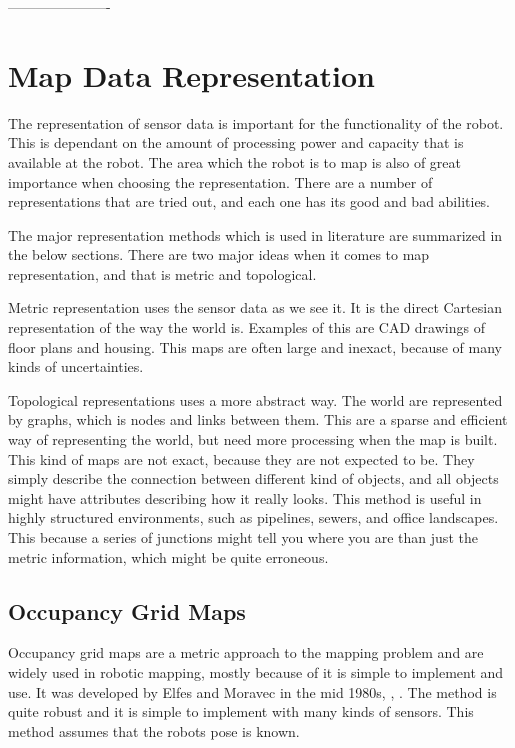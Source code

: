 ----------------------




\section{Map Data Representation}
The representation of sensor data is important for the functionality of the robot. This is
dependant on the amount of processing power and capacity that is available at the robot.
The area which the robot is to map is also of great importance when choosing the
representation. There are a number of representations that are tried out, and each one has its good and
bad abilities. 

The major representation methods which is used in literature are summarized in the below
sections. There are two major ideas when it comes to map representation, and that is
metric and topological.

Metric representation uses the sensor data as we see it. It is the direct Cartesian
representation of the way the world is. Examples of this are CAD drawings of floor plans
and housing. This maps are often large and inexact, because of many kinds of
uncertainties.

Topological representations uses a more abstract way. The world are represented by graphs,
which is nodes and links between them. This are a sparse and efficient way of representing
the world, but need more processing when the map is built. This kind of maps are not
exact, because they are not expected to be. They simply describe the connection between
different kind of objects, and all objects might have attributes describing how it really
looks. This method is useful in highly structured environments, such as pipelines, sewers,
and office landscapes. This because a series of junctions might tell you where you are
than just the metric information, which might be quite erroneous. 


\subsection{Occupancy Grid Maps}
Occupancy grid maps are a metric approach to the mapping problem and are widely used in 
robotic mapping, mostly because of it is simple to implement and use. It was developed 
by Elfes and Moravec in the mid 1980s, \cite{elfes}, \cite{moravec}. The method is quite 
robust and it is simple to implement with many kinds of sensors. This method assumes that 
the robots pose is known.


